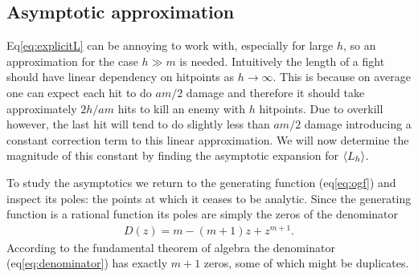 \subsection{Asymptotic approximation}
Eq\ref{eq:explicitL} can be annoying to work with, especially for large $h$, so an approximation for the case $h \gg m$ is needed. Intuitively the length of a fight should have linear dependency on hitpoints as $h \rightarrow \infty$. This is because on average one can expect each hit to do $am/2$ damage and therefore it should take approximately $2h/am$ hits to kill an enemy with $h$ hitpoints. Due to overkill however, the last hit will tend to do slightly less than $am/2$ damage introducing a constant correction term to this linear approximation. We will now determine the magnitude of this constant by finding the asymptotic expansion for $\langle L_h \rangle$.

To study the asymptotics we return to the generating function (eq\ref{eq:ogf}) and inspect its poles: the points at which it ceases to be analytic. Since the generating function is a rational function its poles are simply the zeros of the denominator
\begin{align}
	D(z) = m - (m+1)z + z^{m+1}\label{eq:denominator}.
\end{align}
According to the fundamental theorem of algebra the denominator (eq\ref{eq:denominator}) has exactly $m+1$ zeros, some of which might be duplicates.

